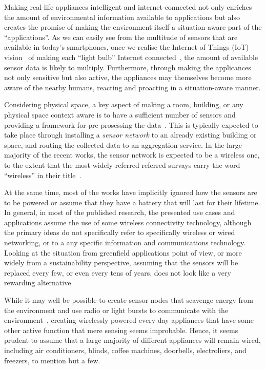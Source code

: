 \documentclass[final]{siamltex}
\begin{document}
Making real-life appliances intelligent and internet-connected not
only enriches the amount of environmental information available to
applications but also creates the promise of making the environment
itself a situation-aware part of the ``applications''.  As we can
easily see from the multitude of sensors that are available in today's
smartphones, once we realise the Internet of Things (IoT)
vision~\cite{Atzori20102787} of making each ``light bulb'' Internet
connected~\cite{cerf1997next}, the amount of available sensor data is
likely to multiply.  Furthermore, through making the applicances not
only sensitive but also active, the appliances may themselves become
more aware of the nearby humans, reacting and proacting in a
situation-aware manner.

Considering physical space, a key aspect of making a room, building,
or any physical space context aware is to have a sufficient number of
sensors and providing a framework for pre-prosessing the
data~\cite{Baldauf2007a}.  This is typically expected to take place
through installing a {\it sensor network} to an already existing
building or space, and routing the collected data to an aggregation
service.  In the large majority of the recent works, the sensor
network is expected to be a wireless one, to the extent that the most
widely referred referred survays carry the word ``wireless'' in their
title~\cite{akyildiz2002wireless, akkaya2005survey}.

At the same time, most of the works have implicitly ignored how the
sensors are to be powered or assume that they have a battery that will
last for their lifetime.  In general, in most of the published
research, the presented use cases and applications assume the use of
some wireless connectivity technology, although the primary ideas do
not specifically refer to specifically wireless or wired networking,
or to a any specific information and communications technology.
Looking at the situation from greenfield applications point of view,
or more widely from a sustainability perspective, assuming that the
sensors will be replaced every few, or even every tens of years, does
not look like a very rewarding alternative.

While it may well be possible to create sensor nodes that scavenge
energy from the environment and use radio or light bursts to
communicate with the environment~\cite{wang2010toward}, creating
wirelessly powered every day appliances that have some other active
function that mere sensing seems improbable.  Hence, it seems prudent
to assume that a large majority of different appliances will remain
wired, including air conditioners, blinds, coffee machines, doorbells,
electroliers, and freezers, to mention but a few.
\end{document}
